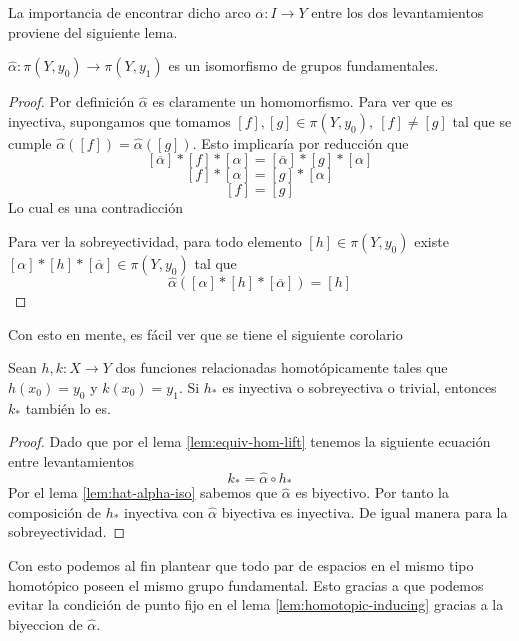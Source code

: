 La importancia de encontrar dicho arco \(\alpha : I \to Y\) entre los
dos levantamientos proviene del siguiente lema.
\begin{lema} \label{lem:hat-alpha-iso}
\(\hat \alpha : \pi (Y, y_0) \to \pi (Y, y_1)\) es un isomorfismo de
grupos fundamentales.
\end{lema}
\begin{proof}
  Por definición \(\hat \alpha\) es claramente un homomorfismo. Para ver
  que es inyectiva, supongamos que tomamos \([f],[g] \in \pi (Y, y_0),\
  [f] \neq [g]\) tal que se cumple \(\hat \alpha ([f]) = \hat \alpha
  ([g])\). Esto implicaría por reducción que
  \[ [\overline{\alpha}] * [f] * [\alpha] = [\overline{\alpha}] * [g] *
    [\alpha] \]
  \[ [f] * [\alpha] = [g] * [\alpha] \]
  \[ [f] = [g] \]
  Lo cual es una contradicción

  Para ver la sobreyectividad, para todo elemento \([h]
  \in \pi (Y,y_0)\) existe \( [\alpha] * [h] * [\overline{\alpha}] \in
  \pi (Y,y_0)\) tal que
  \[ \hat \alpha ([\alpha] * [h] * [\overline{\alpha}]) = [h]\]
\end{proof}
Con esto en mente, es fácil ver que se tiene el siguiente corolario
\begin{corolario}
  Sean \(h,k : X \to Y\) dos funciones relacionadas homotópicamente
  tales que \(h (x_0) = y_0\) y \(k(x_0) = y_1\). Si \(h_*\) es inyectiva
  o sobreyectiva o trivial, entonces \(k_*\) también lo es.
\end{corolario}
\begin{proof}
  Dado que por el lema \ref{lem:equiv-hom-lift} tenemos la siguiente
  ecuación entre levantamientos
  \[ k_* = \hat \alpha \circ h_* \]
  Por el lema \ref{lem:hat-alpha-iso} sabemos que \(\hat \alpha\) es
  biyectivo. Por tanto la composición de \(h_*\) inyectiva con \(\hat
  \alpha\) biyectiva es inyectiva. De igual manera para la
  sobreyectividad.
\end{proof}
Con esto podemos al fin plantear que todo par de espacios en el mismo
tipo homotópico poseen el mismo grupo fundamental. Esto gracias a que
podemos evitar la condición de punto fijo en el lema
\ref{lem:homotopic-inducing} gracias a la biyeccion de \(\hat \alpha\).


